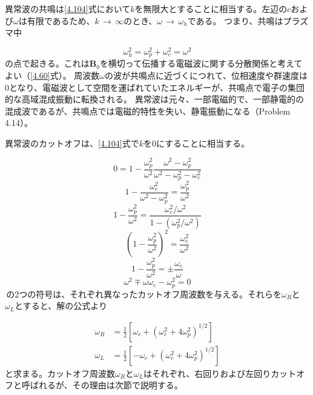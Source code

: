 \documentclass{ltjsarticle}
\numberwithin{equation}{section} %
\begin{document}
異常波の共鳴は\eqref{4.104}式において$k$を無限大とすることに相当する。左辺の$c$および$\omega$は有限であるため、$k\,\to\,\infty$のとき、$\omega\,\to\,\omega_h$である。
つまり、共鳴はプラズマ中

\begin{equation}
  \omega^2_h = \omega^2_p + \omega^2_c = \omega^2 \label{4.105}
\end{equation}
の点で起きる。これは$\bm{B}_0$を横切って伝播する電磁波に関する分散関係と考えてよい（\eqref{4.60}式）。
周波数$\omega$の波が共鳴点に近づくにつれて、位相速度や群速度は0となり、電磁波として空間を運ばれていたエネルギーが、共鳴点で電子の集団的な高域混成振動に転換される。
異常波は元々、一部電磁的で、一部静電的の混成波であるが、共鳴点では電磁的特性を失い、静電振動になる（Problem\,4.14）。

異常波のカットオフは、\eqref{4.104}式で$k$を0にすることに相当する。

\[
  0 = 1 - \frac{\omega^2_p}{\omega^2}\frac{\omega^2 - \omega^2_p}{\omega^2 - \omega^2_p - \omega^2_c}
\]
\[
  1 - \frac{\omega^2_c}{\omega^2 - \omega^2_p} = \frac{\omega^2_p}{\omega^2}
\]
\[
  1 - \frac{\omega^2_p}{\omega^2} = \frac{\omega^2_c/\omega^2}{1 - (\omega^2_p/\omega^2)}
\]
\[
  \left(1 - \frac{\omega^2_p}{\omega^2}\right)^2 = \frac{\omega^2_c}{\omega^2}
\]
\[
  1 - \frac{\omega^2_p}{\omega^2} = \pm \frac{\omega_c}{\omega}
\]
\begin{equation}
  \omega^2 \mp \omega \omega_c - \omega^2_p = 0 \label{4.107}
\end{equation}
\pm \,の2つの符号は、それぞれ異なったカットオフ周波数を与える。それらを$\omega_R$と$\omega_L$とすると、解の公式より

\begin{equation}
  \begin{aligned}
    \omega_R &= \frac{1}{2}\left[\omega_c + (\omega^2_c + 4\omega^2_p)^{1/2}\right]\\
    \omega_L &= \frac{1}{2}\left[-\omega_c + (\omega^2_c + 4\omega^2_p)^{1/2}\right]
  \end{aligned} \label{4.108}
\end{equation}
と求まる。カットオフ周波数$\omega_R$と$\omega_L$はそれぞれ、右回りおよび左回りカットオフと呼ばれるが、その理由は次節で説明する。
\end{document}
